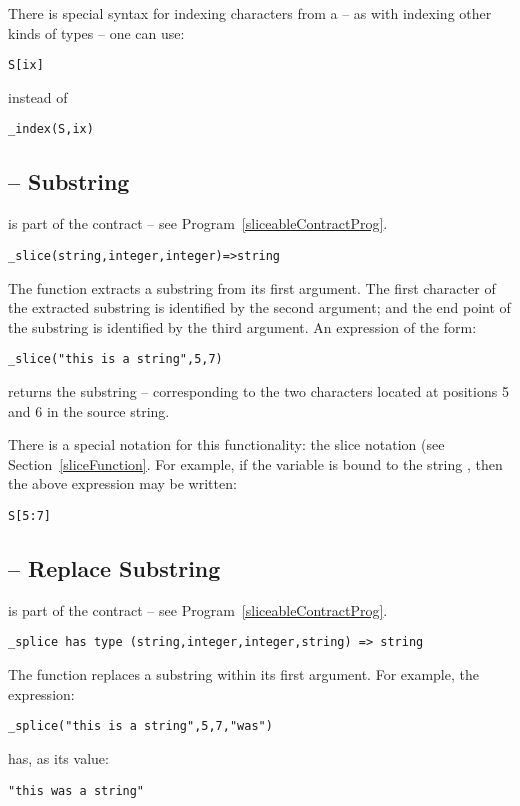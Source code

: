 There is special syntax for indexing characters from a  -- as with indexing other kinds of  types -- one can use:
\begin{lstlisting}
S[ix]
\end{lstlisting}
instead of
\begin{lstlisting}
_index(S,ix)
\end{lstlisting}

\subsection{ -- Substring}
\label{sliceString}
 is part of the  contract -- see Program~\vref{sliceableContractProg}.
\begin{lstlisting}
_slice(string,integer,integer)=>string
\end{lstlisting}
The  function extracts a substring from its first argument. The first character of the extracted substring is identified by the second argument; and the end point of the substring is identified by the third argument. An expression of the form:
\begin{lstlisting}
_slice("this is a string",5,7)
\end{lstlisting}
returns the substring  -- corresponding to the two characters located at positions 5 and 6 in the source string.

There is a special notation for this functionality: the slice notation (see Section~\vref{sliceFunction}. For example, if the variable  is bound to the string , then the above expression may be written:
\begin{lstlisting}
S[5:7]
\end{lstlisting}

\subsection{ -- Replace Substring}
\label{spliceString}
 is part of the  contract -- see Program~\vref{sliceableContractProg}.
\begin{lstlisting}
_splice has type (string,integer,integer,string) => string
\end{lstlisting}
The  function replaces a substring within its first argument. For example, the expression:
\begin{lstlisting}
_splice("this is a string",5,7,"was")
\end{lstlisting}
has, as its value:
\begin{lstlisting}
"this was a string"
\end{lstlisting}

